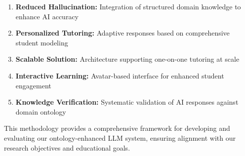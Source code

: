 \begin{enumerate}
    \item \textbf{Reduced Hallucination:} Integration of structured domain knowledge to enhance AI accuracy \cite{su2024confabulation}
    \item \textbf{Personalized Tutoring:} Adaptive responses based on comprehensive student modeling
    \item \textbf{Scalable Solution:} Architecture supporting one-on-one tutoring at scale
    \item \textbf{Interactive Learning:} Avatar-based interface for enhanced student engagement
    \item \textbf{Knowledge Verification:} Systematic validation of AI responses against domain ontology \cite{scibite2024ontologies}
\end{enumerate}

This methodology provides a comprehensive framework for developing and evaluating our ontology-enhanced LLM system, ensuring alignment with our research objectives and educational goals. 